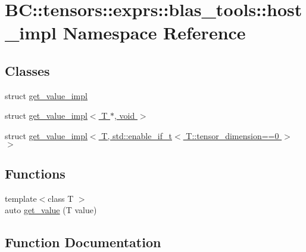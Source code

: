 \hypertarget{namespaceBC_1_1tensors_1_1exprs_1_1blas__tools_1_1host__impl}{}\section{BC\+:\+:tensors\+:\+:exprs\+:\+:blas\+\_\+tools\+:\+:host\+\_\+impl Namespace Reference}
\label{namespaceBC_1_1tensors_1_1exprs_1_1blas__tools_1_1host__impl}
\subsection*{Classes}
\begin{DoxyCompactItemize}
\item 
struct \hyperlink{structBC_1_1tensors_1_1exprs_1_1blas__tools_1_1host__impl_1_1get__value__impl}{get\+\_\+value\+\_\+impl}
\item 
struct \hyperlink{structBC_1_1tensors_1_1exprs_1_1blas__tools_1_1host__impl_1_1get__value__impl_3_01T_01_5_00_01void_01_4}{get\+\_\+value\+\_\+impl$<$ T $\ast$, void $>$}
\item 
struct \hyperlink{structBC_1_1tensors_1_1exprs_1_1blas__tools_1_1host__impl_1_1get__value__impl_3_01T_00_01std_1_17177f5e42a2ea6a8adbe8a38eb597270}{get\+\_\+value\+\_\+impl$<$ T, std\+::enable\+\_\+if\+\_\+t$<$ T\+::tensor\+\_\+dimension==0 $>$ $>$}
\end{DoxyCompactItemize}
\subsection*{Functions}
\begin{DoxyCompactItemize}
\item 
{\footnotesize template$<$class T $>$ }\\auto \hyperlink{namespaceBC_1_1tensors_1_1exprs_1_1blas__tools_1_1host__impl_a8edf03c11820d2378616541d5a6868c3}{get\+\_\+value} (T value)
\end{DoxyCompactItemize}


\subsection{Function Documentation}
